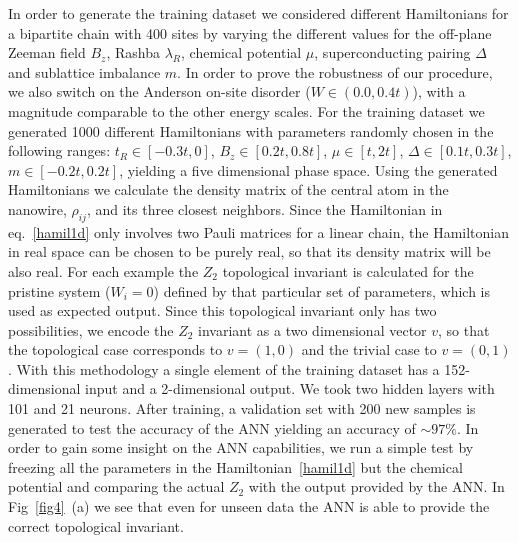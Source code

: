 In order to generate the training dataset we considered different Hamiltonians
for a bipartite chain with 400 sites by varying the different values for the
off-plane Zeeman field $B_z$, Rashba $\lambda_R$, chemical potential $\mu$, 
superconducting pairing $\Delta$ and sublattice imbalance $m$.
In order to prove the robustness of our procedure, we also
switch on the Anderson on-site
disorder ($W\in (0.0,0.4t)$), with
a magnitude comparable to the other energy scales.
For the training dataset we generated 1000 different Hamiltonians with
parameters randomly chosen in the following ranges:
$t_R\in[-0.3t,0]$, $B_z\in[0.2t,0.8t]$, $\mu\in[t,2t]$, $\Delta\in[0.1t,0.3t]$,
$m\in[-0.2t,0.2t]$, 
yielding a five dimensional phase space. Using the generated Hamiltonians we
calculate the density matrix of the central atom in the nanowire, $\rho_{ij}$,
and its three closest neighbors.
Since the Hamiltonian in eq.~\eqref{hamil1d} only involves two Pauli matrices for
a linear chain, the Hamiltonian in real space can be chosen to be purely real,
so that its density matrix will be also real.
For each example the $Z_2$ topological invariant is calculated for the pristine
system ($W_i=0$)
defined by that particular set of parameters, which is used as expected
output. Since this topological invariant only has two possibilities, we encode
the $Z_2$ invariant as a two dimensional vector $v$, so that the topological
case corresponds to $v=(1,0)$ and the trivial case to $v=(0,1)$.
With this methodology a single element of the training dataset has a
152-dimensional input and a 2-dimensional output.
We took two hidden layers with 101 and 21 neurons.
After training, a validation set with 200 new samples is generated to test the
accuracy of the ANN yielding an accuracy of $\sim97\%$.
In order to gain some insight on the ANN capabilities, we run a simple test by
freezing all the parameters in the Hamiltonian~\eqref{hamil1d} but the chemical
potential and comparing the actual $Z_2$ with the output provided by the ANN.
In Fig~\ref{fig4}~(a) we see that even for unseen data the ANN is able to provide
the correct topological invariant.

